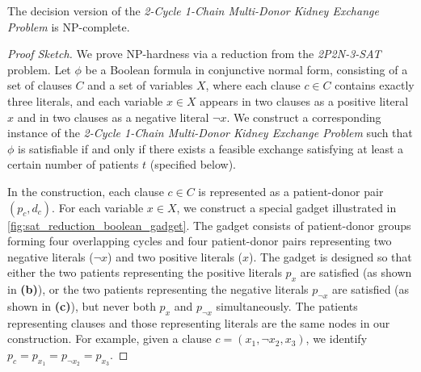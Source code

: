 \begin{lemma}
\label{lemma:2c1c_npc}
The decision version of the \textit{2-Cycle 1-Chain Multi-Donor Kidney Exchange Problem} is NP-complete.
\end{lemma}

\begin{proof}[Proof Sketch]
We prove NP-hardness via a reduction from the \textit{2P2N-3-SAT} problem. Let $\phi$ be a Boolean formula in conjunctive normal form, consisting of a set of clauses $C$ and a set of variables $X$, where each clause $c \in C$ contains exactly three literals, and each variable $x \in X$ appears in two clauses as a positive literal $x$ and in two clauses as a negative literal $\neg{x}$. We construct a corresponding instance of the \textit{2-Cycle 1-Chain Multi-Donor Kidney Exchange Problem} such that $\phi$ is satisfiable if and only if there exists a feasible exchange satisfying at least a certain number of patients $t$ (specified below).

In the construction, each clause $c \in C$ is represented as a patient-donor pair $(p_c, d_c)$. For each variable $x \in X$, we construct a special gadget illustrated in \autoref{fig:sat_reduction_boolean_gadget}. The gadget consists of patient-donor groups forming four overlapping cycles and four patient-donor pairs representing two negative literals ($\neg{x}$) and two positive literals ($x$). The gadget is designed so that either the two patients representing the positive literals $p_x$ are satisfied (as shown in \textbf{(b)}), or the two patients representing the negative literals $p_{\neg{x}}$ are satisfied (as shown in \textbf{(c)}), but never both $p_x$ and $p_{\neg{x}}$ simultaneously. The patients representing clauses and those representing literals are the same nodes in our construction. For example, given a clause $c = (x_1, \neg{x_2}, x_3)$, we identify $p_c = p_{x_1} = p_{\neg{x_2}} = p_{x_3}$.




\end{proof}
